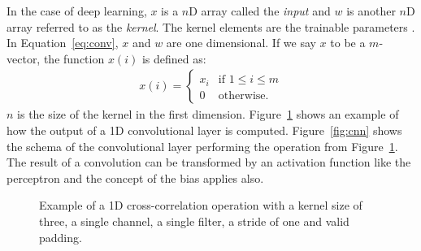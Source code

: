 \documentclass[]{article}
\begin{document}
In the case of deep learning, $x$ is a $n$D array called the
\textit{input} and $w$ is another $n$D array referred to as the
\textit{kernel}. The kernel elements are the trainable parameters
\citep{goodfellow_et_al_2016}.
In Equation~\ref{eq:conv}, $x$ and $w$ are one dimensional.
If we say $x$ to be a $m$-vector, the function $x(i)$ is defined as:
\begin{align}
  \label{eq:valid_conv}
  x(i) = \begin{cases}
    x_i &\text{if } 1 \leq i \leq m \\
    0 &\text{otherwise.}
  \end{cases}
\end{align}
$n$ is the size of the kernel in the first dimension.
Figure~\ref{fig:conv_op} shows an example of how the output of a
1D convolutional layer is computed.
Figure~\ref{fig:cnn} shows the schema of the convolutional
layer performing the operation from Figure~\ref{fig:conv_op}.
The result of a convolution can be transformed by an activation
function like the perceptron and the concept of the bias applies also.

\begin{figure}
\begin{center}
\end{center}
\caption{Example of a 1D cross-correlation operation with a kernel
  size of three, a single channel, a single filter, a stride of one
  and valid padding.}
\label{fig:conv_op}
\end{figure}
\end{document}
